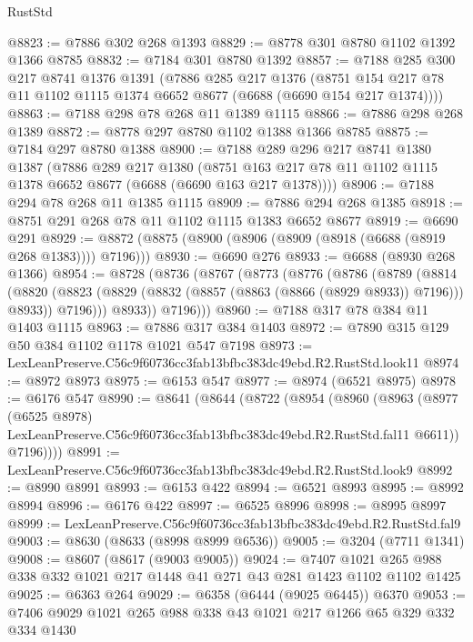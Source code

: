 \begin{lexlean}{RustStd}
\begin{coremodule}
@8823 := @7886 @302 @268 @1393
@8829 := @8778 @301 @8780 @1102 @1392 @1366 @8785
@8832 := @7184 @301 @8780 @1392
@8857 := @7188
    @285
    @300
    @217
    @8741
    @1376
    @1391
    (@7886
      @285
      @217
      @1376
      (@8751 @154 @217 @78 @11 @1102 @1115 @1374 @6652 @8677 (@6688 (@6690 @154 @217 @1374))))
@8863 := @7188 @298 @78 @268 @11 @1389 @1115
@8866 := @7886 @298 @268 @1389
@8872 := @8778 @297 @8780 @1102 @1388 @1366 @8785
@8875 := @7184 @297 @8780 @1388
@8900 := @7188
    @289
    @296
    @217
    @8741
    @1380
    @1387
    (@7886
      @289
      @217
      @1380
      (@8751 @163 @217 @78 @11 @1102 @1115 @1378 @6652 @8677 (@6688 (@6690 @163 @217 @1378))))
@8906 := @7188 @294 @78 @268 @11 @1385 @1115
@8909 := @7886 @294 @268 @1385
@8918 := @8751 @291 @268 @78 @11 @1102 @1115 @1383 @6652 @8677
@8919 := @6690 @291
@8929 := @8872 (@8875 (@8900 (@8906 (@8909 (@8918 (@6688 (@8919 @268 @1383)))) @7196)))
@8930 := @6690 @276
@8933 := @6688 (@8930 @268 @1366)
@8954 := @8728
    (@8736
      (@8767
        (@8773
          (@8776
            (@8786
              (@8789
                (@8814
                  (@8820
                    (@8823 (@8829 (@8832 (@8857 (@8863 (@8866 (@8929 @8933)) @7196))) @8933))
                    @7196)))
              @8933))
          @7196)))
@8960 := @7188 @317 @78 @384 @11 @1403 @1115
@8963 := @7886 @317 @384 @1403
@8972 := @7890 @315 @129 @50 @384 @1102 @1178 @1021 @547 @7198
@8973 := LexLeanPreserve.C56c9f60736cc3fab13bfbc383dc49ebd.R2.RustStd.look11
@8974 := @8972 @8973
@8975 := @6153 @547
@8977 := @8974 (@6521 @8975)
@8978 := @6176 @547
@8990 := @8641
    (@8644
      (@8722
        (@8954
          (@8960
            (@8963
              (@8977
                (@6525 @8978)
                LexLeanPreserve.C56c9f60736cc3fab13bfbc383dc49ebd.R2.RustStd.fal11
                @6611))
            @7196))))
@8991 := LexLeanPreserve.C56c9f60736cc3fab13bfbc383dc49ebd.R2.RustStd.look9
@8992 := @8990 @8991
@8993 := @6153 @422
@8994 := @6521 @8993
@8995 := @8992 @8994
@8996 := @6176 @422
@8997 := @6525 @8996
@8998 := @8995 @8997
@8999 := LexLeanPreserve.C56c9f60736cc3fab13bfbc383dc49ebd.R2.RustStd.fal9
@9003 := @8630 (@8633 (@8998 @8999 @6536))
@9005 := @3204 (@7711 @1341)
@9008 := @8607 (@8617 (@9003 @9005))
@9024 := @7407 @1021 @265 @988 @338 @332 @1021 @217 @1448 @41 @271 @43 @281 @1423 @1102 @1102 @1425
@9025 := @6363 @264
@9029 := @6358 (@6444 (@9025 @6445)) @6370
@9053 := @7406
    @9029
    @1021
    @265
    @988
    @338
    @43
    @1021
    @217
    @1266
    @65
    @329
    @332
    @334
    @1430

\end{coremodule}
\end{lexlean}
